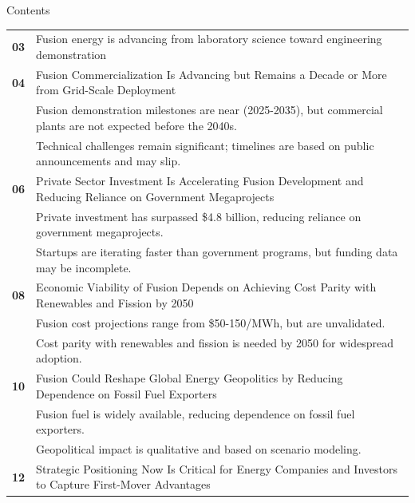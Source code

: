 \documentclass[10pt,a4paper]{article}
\begin{document}
\clearpage
{\sffamily\fontsize{26}{31}\selectfont\color{BONavy} Contents}\par\vspace{10pt}
\begin{tabularx}{\linewidth}{p{14mm}Y}
\textcolor{BOGreen}{\bfseries 03} & Fusion energy is advancing from laboratory science toward engineering demonstration \\[7pt]
\textcolor{BOGreen}{\bfseries 04} & Fusion Commercialization Is Advancing but Remains a Decade or More from Grid-Scale Deployment \\[5pt]
 & {\scriptsize\color{BOMuted} Fusion demonstration milestones are near (2025-2035), but commercial plants are not expected before the 2040s.} \\[1pt]
 & {\scriptsize\color{BOMuted} Technical challenges remain significant; timelines are based on public announcements and may slip.} \\[1pt]
\textcolor{BOGreen}{\bfseries 06} & Private Sector Investment Is Accelerating Fusion Development and Reducing Reliance on Government Megaprojects \\[5pt]
 & {\scriptsize\color{BOMuted} Private investment has surpassed \$4.8 billion, reducing reliance on government megaprojects.} \\[1pt]
 & {\scriptsize\color{BOMuted} Startups are iterating faster than government programs, but funding data may be incomplete.} \\[1pt]
\textcolor{BOGreen}{\bfseries 08} & Economic Viability of Fusion Depends on Achieving Cost Parity with Renewables and Fission by 2050 \\[5pt]
 & {\scriptsize\color{BOMuted} Fusion cost projections range from \$50-150/MWh, but are unvalidated.} \\[1pt]
 & {\scriptsize\color{BOMuted} Cost parity with renewables and fission is needed by 2050 for widespread adoption.} \\[1pt]
\textcolor{BOGreen}{\bfseries 10} & Fusion Could Reshape Global Energy Geopolitics by Reducing Dependence on Fossil Fuel Exporters \\[5pt]
 & {\scriptsize\color{BOMuted} Fusion fuel is widely available, reducing dependence on fossil fuel exporters.} \\[1pt]
 & {\scriptsize\color{BOMuted} Geopolitical impact is qualitative and based on scenario modeling.} \\[1pt]
\textcolor{BOGreen}{\bfseries 12} & Strategic Positioning Now Is Critical for Energy Companies and Investors to Capture First-Mover Advantages \\[5pt]

\end{tabularx}
\end{document}
